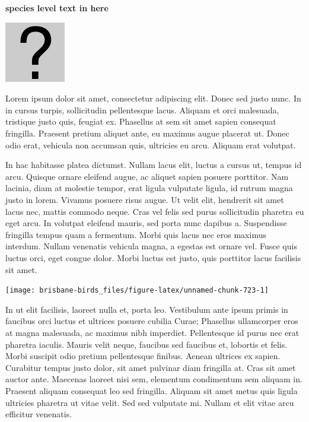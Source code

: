 \documentclass[]{book}
\let\origfigure\figure
\let\endorigfigure\endfigure
\renewenvironment{figure}[1][2] {
  \expandafter\origfigure\expandafter[H]
} {
  \endorigfigure
}
\begin{document}
\textbf{species level text in here}

\begin{figure}
\centering
\includegraphics{assets/missing.png}
\caption{No image for species}
\end{figure}

Lorem ipsum dolor sit amet, consectetur adipiscing elit. Donec sed justo
nunc. In in cursus turpis, sollicitudin pellentesque lacus. Aliquam et
orci malesuada, tristique justo quis, feugiat ex. Phasellus at sem sit
amet sapien consequat fringilla. Praesent pretium aliquet ante, eu
maximus augue placerat ut. Donec odio erat, vehicula non accumsan quis,
ultricies eu arcu. Aliquam erat volutpat.

In hac habitasse platea dictumst. Nullam lacus elit, luctus a cursus ut,
tempus id arcu. Quisque ornare eleifend augue, ac aliquet sapien posuere
porttitor. Nam lacinia, diam at molestie tempor, erat ligula vulputate
ligula, id rutrum magna justo in lorem. Vivamus posuere risus augue. Ut
velit elit, hendrerit sit amet lacus nec, mattis commodo neque. Cras vel
felis sed purus sollicitudin pharetra eu eget arcu. In volutpat eleifend
mauris, sed porta nunc dapibus a. Suspendisse fringilla tempus quam a
fermentum. Morbi quis lacus nec eros maximus interdum. Nullam venenatis
vehicula magna, a egestas est ornare vel. Fusce quis luctus orci, eget
congue dolor. Morbi luctus est justo, quis porttitor lacus facilisis sit
amet.

\begin{figure}
\texttt{[image: brisbane-birds\_files/figure-latex/unnamed-chunk-723-1]} \caption{insert figure caption}\label{fig:unnamed-chunk-723}
\end{figure}

In ut elit facilisis, laoreet nulla et, porta leo. Vestibulum ante ipsum
primis in faucibus orci luctus et ultrices posuere cubilia Curae;
Phasellus ullamcorper eros at magna malesuada, ac maximus nibh
imperdiet. Pellentesque id purus nec erat pharetra iaculis. Mauris velit
neque, faucibus sed faucibus et, lobortis et felis. Morbi suscipit odio
pretium pellentesque finibus. Aenean ultrices ex sapien. Curabitur
tempus justo dolor, sit amet pulvinar diam fringilla at. Cras sit amet
auctor ante. Maecenas laoreet nisi sem, elementum condimentum sem
aliquam in. Praesent aliquam consequat leo sed fringilla. Aliquam sit
amet metus quis ligula ultricies pharetra ut vitae velit. Sed sed
vulputate mi. Nullam et elit vitae arcu efficitur venenatis.
\end{document}
